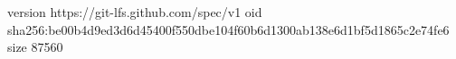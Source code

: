 version https://git-lfs.github.com/spec/v1
oid sha256:be00b4d9ed3d6d45400f550dbe104f60b6d1300ab138e6d1bf5d1865c2e74fe6
size 87560
